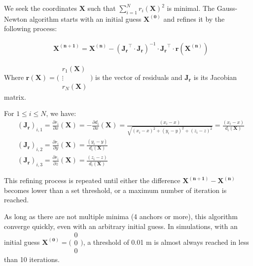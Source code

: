 \documentclass[12pt,a4paper,fleqn]{report}
\begin{document}
\begin{appendices}
{We seek the coordinates $\mathbf{X}$ such that $\sum\limits_{i=1}^N r_i(\mathbf{X})^2$ is minimal. The Gauss-Newton algorithm starts with an initial guess $\mathbf{X^{(0)}}$ and refines it by the following process:

\begin{align*}
	& \mathbf{X^{(n+1)}} = \mathbf{X^{(n)}} - (\mathbf{J_r}^\top \cdot \mathbf{J_r})^{-1} \cdot \mathbf{J_r}^\top \cdot \mathbf{r}(\mathbf{X^{(n)}})
\end{align*}

Where $\mathbf{r}(\mathbf{X}) = \bigg( \begin{smallmatrix} r_1(\mathbf{X}) \\ \vdots \\ r_N(\mathbf{X}) \end{smallmatrix} \bigg)$ is the vector of residuals and $\mathbf{J_r}$ is its Jacobian matrix.

\medskip

For $1 \leq i \leq N$, we have:
\begin{align*}
	& (\mathbf{J_r})_{i,1}
	= \frac{\partial r_i}{\partial x}(\mathbf{X})
	= - \frac{\partial d_i}{\partial x}(\mathbf{X})
	= \frac{(x_i - x)}{\sqrt{(x_i - x)^2 + (y_i - y)^2 + (z_i - z)^2}}
	= \frac{(x_i - x)}{d_i(\mathbf{X})} \\
	& (\mathbf{J_r})_{i,2}
	= \frac{\partial r_i}{\partial y}(\mathbf{X})
	= \frac{(y_i - y)}{d_i(\mathbf{X})} \\
	& (\mathbf{J_r})_{i,3}
	= \frac{\partial r_i}{\partial z}(\mathbf{X})
	= \frac{(z_i - z)}{d_i(\mathbf{X})}
\end{align*}

This refining process is repeated until either the difference $\mathbf{X^{(n+1)}} - \mathbf{X^{(n)}}$ becomes lower than a set threshold, or a maximum number of iteration is reached.


\medskip

As long as there are not multiple minima (4 anchors or more), this algorithm converge quickly, even with an arbitrary initial guess. In simulations, with an initial guess $\mathbf{X^{(0)}} = \big( \begin{smallmatrix} 0 \\ 0 \\ 0 \end{smallmatrix} \big)$, a threshold of 0.01 m is almost always reached in less than 10 iterations.

}

\end{appendices}
\end{document}

